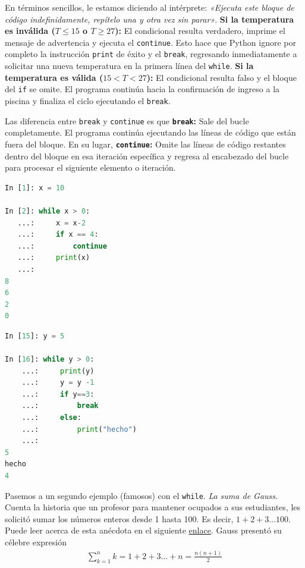 \documentclass[12pt]{article}
\begin{document}
En términos sencillos, le estamos diciendo al intérprete: 
\textit{«Ejecuta este bloque de código indefinidamente, 
repítelo una y otra vez sin parar»}. 
\textbf{Si la temperatura es inválida ($T \le 15$ o $T \ge 27$):} El condicional 
resulta verdadero, imprime el mensaje de advertencia y ejecuta el \lstinline|continue|. 
Esto hace que Python ignore por completo la instrucción \lstinline|print| de éxito y 
el \lstinline|break|, regresando inmediatamente a solicitar una nueva temperatura en la primera línea del \lstinline|while|.
\textbf{Si la temperatura es válida ($15 < T < 27$):} El condicional resulta falso y el bloque del \lstinline|if| se omite. El programa continúa hacia la confirmación de ingreso a la piscina y finaliza el ciclo ejecutando el \lstinline|break|.

Las diferencia entre \lstinline|break| y \lstinline|continue| es que 
\textbf{\texttt{break}:} Sale del bucle completamente. El programa continúa ejecutando 
las líneas de código que están fuera del bloque.
En su lugar, \textbf{\texttt{continue}:} Omite las líneas de código restantes 
dentro del bloque en esa iteración específica y regresa al encabezado del bucle 
para procesar el siguiente elemento o iteración.
\begin{lstlisting}[language=Python, captionpos=t,]
In [1]: x = 10

In [2]: while x > 0:
   ...:     x = x-2
   ...:     if x == 4:
   ...:         continue
   ...:     print(x)
   ...: 
8
6
2
0    
\end{lstlisting}
\begin{lstlisting}[language=Python, captionpos=t,]
In [15]: y = 5

In [16]: while y > 0:
    ...:     print(y)
    ...:     y = y -1
    ...:     if y==3:
    ...:         break
    ...:     else:
    ...:         print("hecho")
    ...: 
5
hecho
4
\end{lstlisting}
Pasemos a un segundo ejemplo (famosos) con el \lstinline|while|. 
\textit{La suma de Gauss}. Cuenta la historia que un profesor para mantener 
ocupados a sus estudiantes, les solicitó sumar los números enteros desde 1 hasta 100.
Es decir, $ 1 + 2 + 3\dots 100$. Puede leer acerca de esta anécdota en el siguiente 
\href{https://francis.naukas.com/2010/04/15/iii-carnaval-de-matematicas-toda-la-verdad-sobre-la-anecdota-de-gauss-el-nino-prodigio-su-profesor-y-la-suma-de-1-a-100/}{enlace}.
Gauss presentó su célebre expresión 
\begin{align}
    \sum_{k=1}^{n} k = 1 +2 +3\dots +n =\frac{n(n+1)}{2}
\end{align}
\end{document}
